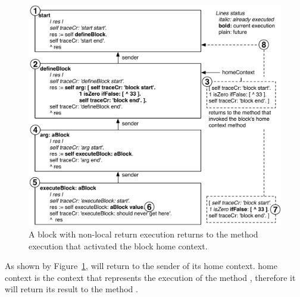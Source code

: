 \documentclass[a4paper,10pt,twoside]{book}
\begin{document}
\begin{figure}[!h]
\begin{center}\includegraphics[width=\textwidth]{nonLocalReturn2}
\caption{A block with non-local return execution returns to the method execution that activated the block home context.\label{nonLocalReturn}}
\end{center}
\end{figure}

As shown by Figure~\ref{nonLocalReturn}, \ct{[^33]} will return to the sender of its home context. \ct{[^33]} home context is the context that represents the execution of the method , therefore it will return its result to the method .
\end{document}

